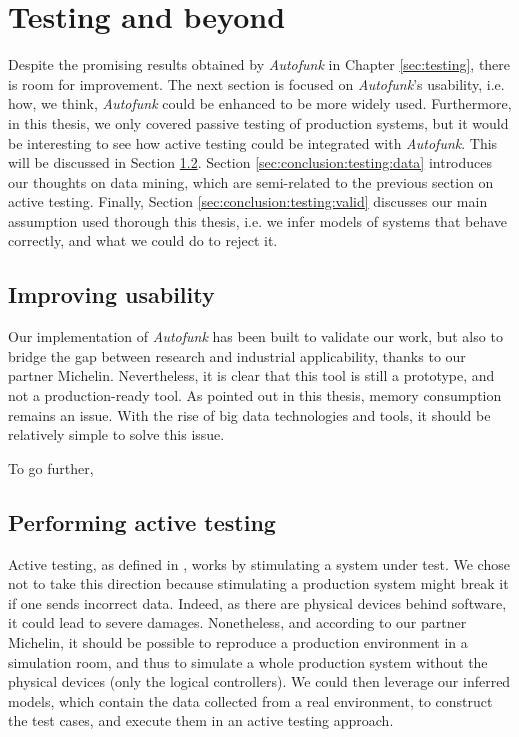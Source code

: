 \section{Testing and beyond}
\label{sec:conclusion:testing}

Despite the promising results obtained by \textit{Autofunk} in
Chapter \ref{sec:testing}, there is room for improvement. The
next section is focused on \textit{Autofunk}'s usability, i.e.
how, we think, \textit{Autofunk} could be enhanced to be more
widely used. Furthermore, in this thesis, we only covered passive
testing of production systems, but it would be interesting to see
how active testing could be integrated with \textit{Autofunk}.
This will be discussed in Section
\ref{sec:conclusion:testing:active}. Section
\ref{sec:conclusion:testing:data} introduces our thoughts on data
mining, which are semi-related to the previous section on active
testing. Finally, Section \ref{sec:conclusion:testing:valid}
discusses our main assumption used thorough this thesis, i.e. we
infer models of systems that behave correctly, and what we could
do to reject it.


\subsection{Improving usability}

Our implementation of \textit{Autofunk} has been built to
validate our work, but also to bridge the gap between research
and industrial applicability, thanks to our partner Michelin.
Nevertheless, it is clear that this tool is still a prototype,
and not a production-ready tool. As pointed out in this thesis,
memory consumption remains an issue. With the rise of big data
technologies and tools, it should be relatively simple to solve
this issue.

To go further, 


\subsection{Performing active testing}
\label{sec:conclusion:testing:active}

Active testing, as defined in
,
works by stimulating a system under test. We chose not to take
this direction because stimulating a production system might
break it if one sends incorrect data. Indeed, as there are
physical devices behind software, it could lead to severe
damages.  Nonetheless, and according to our partner Michelin, it
should be possible to reproduce a production environment in a
simulation room, and thus to simulate a whole production system
without the physical devices (only the logical controllers). We
could then leverage our inferred models, which contain the data
collected from a real environment, to construct the test cases,
and execute them in an active testing approach.

